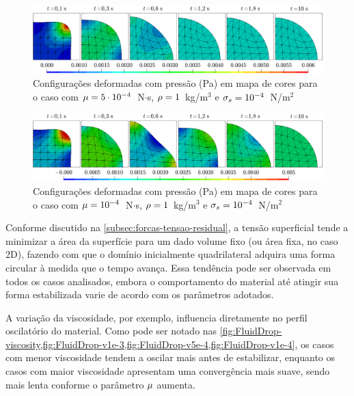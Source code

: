 \documentclass[Tese.tex]{subfiles}
\begin{document}
\begin{figure}[!htb]
	\centering
	\caption{Configurações deformadas com pressão (Pa) em mapa de cores para o caso com $\mu=5\cdot10^{-4}$~N$\cdot$s, $\rho = 1$~kg/m$^3$ e $\sigma_s = 10^{-4}$~N/m$^2$}
	\label{fig:FluidDrop-v5e-4}
	\includegraphics[scale=0.42]{Figuras/SurfaceTension2D/Paraview/v5e-4.png}
\end{figure}

\begin{figure}[!htb]
	\centering
	\caption{Configurações deformadas com pressão (Pa) em mapa de cores para o caso com $\mu = 10^{-4}$~N$\cdot$s, $\rho = 1$~kg/m$^3$ e $\sigma_s = 10^{-4}$~N/m$^2$}
	\label{fig:FluidDrop-v1e-4}
	\includegraphics[scale=0.42]{Figuras/SurfaceTension2D/Paraview/v1e-4.png}
\end{figure}

Conforme discutido na \cref{subsec:forcas-tensao-residual}, a tensão superficial tende a minimizar a área da superfície para um dado volume fixo (ou área fixa, no caso 2D), fazendo com que o domínio inicialmente quadrilateral adquira uma forma circular à medida que o tempo avança. Essa tendência pode ser observada em todos os casos analisados, embora o comportamento do material até atingir sua forma estabilizada varie de acordo com os parâmetros adotados. 

A variação da viscosidade, por exemplo, influencia diretamente no perfil oscilatório do material. Como pode ser notado nas \cref{fig:FluidDrop-viscosity,fig:FluidDrop-v1e-3,fig:FluidDrop-v5e-4,fig:FluidDrop-v1e-4}, os casos com menor viscosidade tendem a oscilar mais antes de estabilizar, enquanto os casos com maior viscosidade apresentam uma convergência mais suave, sendo mais lenta conforme o parâmetro $\mu$ aumenta.
\end{document}
